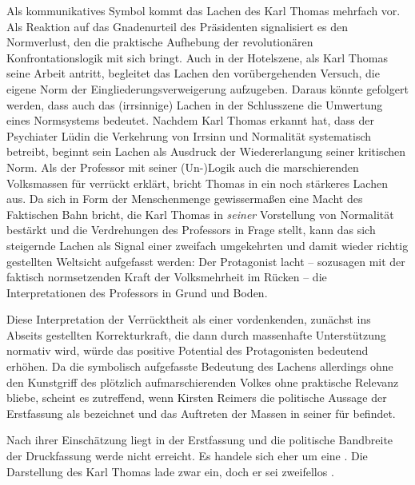 Als kommunikatives Symbol kommt das Lachen des Karl Thomas mehrfach vor.
Als Reaktion auf das Gnadenurteil des Präsidenten signalisiert es den
Normverlust, den die praktische Aufhebung der revolutionären
Konfrontationslogik mit sich bringt. Auch in der Hotelszene, als Karl Thomas
seine Arbeit antritt, begleitet das Lachen den vorübergehenden Versuch, die
eigene Norm der Eingliederungsverweigerung aufzugeben.
Daraus könnte gefolgert werden, dass auch das (irrsinnige) Lachen in der
Schlusszene die Umwertung eines Normsystems bedeutet.
Nachdem Karl Thomas erkannt hat, dass der Psychiater Lüdin die Verkehrung von
Irrsinn und Normalität systematisch betreibt, beginnt sein Lachen als Ausdruck
der Wiedererlangung seiner kritischen Norm.
Als der Professor mit seiner (Un-)Logik auch die
marschierenden Volksmassen für verrückt erklärt, bricht Thomas in ein noch
stärkeres Lachen aus. 
Da sich in Form der Menschenmenge gewissermaßen eine Macht des Faktischen Bahn
bricht, die Karl Thomas in \emph{seiner} Vorstellung von Normalität bestärkt
und die Verdrehungen des Professors in Frage stellt, kann das sich
steigernde Lachen als Signal einer zweifach umgekehrten und damit wieder
richtig gestellten Weltsicht aufgefasst werden: Der Protagonist lacht --
sozusagen mit der faktisch normsetzenden Kraft der Volksmehrheit im Rücken -- die
Interpretationen des Professors in Grund und Boden. 

Diese Interpretation der Verrücktheit als einer vordenkenden, zunächst ins
Abseits gestellten Korrekturkraft, die dann durch massenhafte
Unterstützung normativ  wird, würde das positive Potential des
Protagonisten bedeutend erhöhen. Da die symbolisch aufgefasste Bedeutung des Lachens
allerdings ohne den
Kunstgriff des plötzlich aufmarschierenden Volkes ohne praktische Relevanz
bliebe, scheint es zutreffend, wenn Kirsten Reimers die politische
Aussage der Erstfassung als \Cite{sehr schwammig} bezeichnet und das
Auftreten der Massen in seiner \Cite{politischen Zielsetzung} für
\Cite{unklar} befindet. 

Nach ihrer Einschätzung liegt in der Erstfassung \Cite{der Schwerpunkt des
  Dramas auf dem Konflikt zischen Karl Thomas und Kilman} und die politische
Bandbreite der Druckfassung werde nicht
erreicht. Es handele sich eher um eine \Cite{psychologische Studie der
  Hauptfigur}. Die Darstellung des Karl Thomas lade zwar \Cite{zum Mitleiden
  und Einfühlen} ein, doch er sei zweifellos \Cite{kein eindeutig positiver
  Held}.

